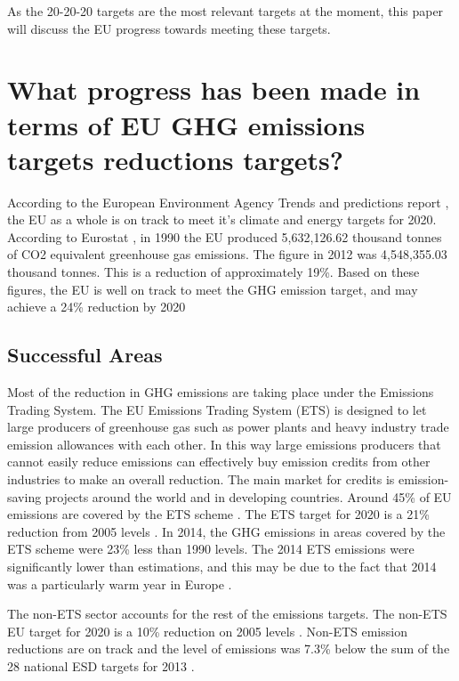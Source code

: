 \documentclass[12pt]{article} %
\begin{document}
As the 20-20-20 targets are the most relevant targets at the moment, this paper will discuss the EU progress towards meeting these targets.


\section{What progress has been made in terms of EU GHG emissions targets reductions targets?}
According to the European Environment Agency Trends and predictions report \cite{EEA/2015}, the EU as a whole is on track to meet it's climate and energy targets for 2020.
According to Eurostat \cite{Eurostat:1}, in 1990 the EU produced 5,632,126.62 thousand tonnes of CO2 equivalent greenhouse gas emissions. The figure in 2012 was 4,548,355.03 thousand tonnes. This is a reduction of approximately 19\%. 
Based on these figures, the EU is well on track to meet the GHG emission target, and may achieve a 24\% reduction by 2020 \cite{EEA/2015}

\subsection{Successful Areas}
Most of the reduction in GHG emissions are taking place under the Emissions Trading System.
The EU Emissions Trading System (ETS) is designed to let large producers of greenhouse gas such as power plants and heavy industry trade emission allowances with each other. In this way large emissions producers that cannot easily reduce emissions can effectively buy emission credits from other industries to make an overall reduction. The main market for credits is emission-saving projects around the world and in developing countries.
Around 45\% of EU emissions are covered by the ETS scheme \cite{ETAFacts:1}.
The ETS target for 2020 is a 21\% reduction from 2005 levels \cite{2020Targets}.
In 2014, the GHG emissions in areas covered by the ETS scheme were 23\% less than 1990 levels.
The 2014 ETS emissions were significantly lower than estimations, and this may be due to the fact that 2014 was a particularly warm year in Europe \cite{EEA/2015}.

The non-ETS sector accounts for the rest of the emissions targets. The non-ETS EU target for 2020 is a 10\% reduction on 2005 levels \cite{2020Targets}. Non-ETS emission reductions are on track and the level of emissions was 7.3\% below the sum of the 28 national ESD targets for 2013 \cite{EEA/2015}.
\end{document}
